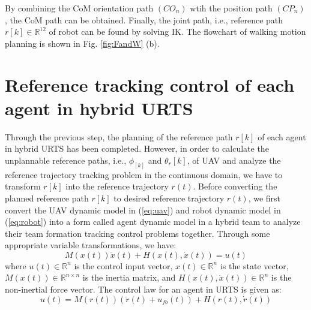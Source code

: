 \documentclass[journal,12pt,onecolumn,draftclsnofoot,]{IEEEtran}
\begin{document}
By combining the CoM orientation path $(CO_n)$ wtih the position path $(CP_n)$, the CoM path can be obtained. Finally, the joint path, i.e., reference path $r[k]\in\mathbb{R}^{12}$ of robot can be found by solving IK. The flowchart of walking motion planning is shown in Fig. \ref{fig:FandW} (b).

\section{Reference tracking control of each agent in hybrid URTS}
Through the previous step, the planning of the reference path $r[k]$ of each agent in hybrid URTS has been completed. However, in order to calculate the unplannable reference paths, i.e., $\phi_[k]$ and $\theta_r[k]$, of UAV and analyze the reference trajectory tracking problem in the continuous domain, we have to transform $r[k]$ into the reference trajectory $r(t)$. Before converting the planned reference path $r[k]$ to desired reference trajectory $r(t)$, we first convert the UAV dynamic model in (\ref{eq:uav}) and robot dynamic model in (\ref{eq:robot}) into a form called agent dynamic model in a hybrid team to analyze their team formation tracking control problems together. Through some appropriate variable transformations, we have:
\begin{equation} \label{eq:agent} 
    M(x(t))\ddot{x}(t) + H(x(t),\dot{x}(t)) = u(t)
\end{equation}
where $u(t)\in\mathbb{R}^n$ is the control input vector, $x(t)\in\mathbb{R}^n$ is the state vector, $M(x(t))\in\mathbb{R}^{n\times n}$ is the inertia matrix, and $H(x(t),\dot{x}(t))\in\mathbb{R}^n$ is the non-inertial force vector. The control law for an agent in URTS is given as:
\begin{equation} \label{eq:control}
    u(t)= M(r(t))(\ddot{r}(t) + u_{fb}(t)) + H(r(t),\dot{r}(t)) 
\end{equation}
\end{document}
